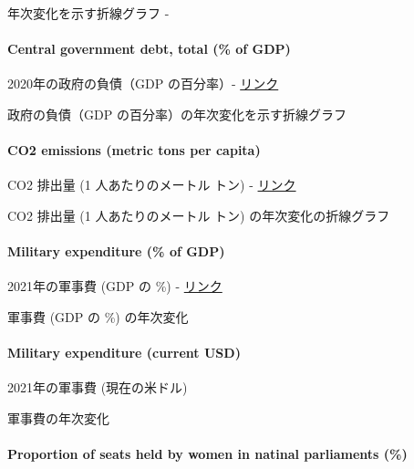 \documentclass[
]{bxjsbook}
\theoremstyle{definition}
\theoremstyle{definition}
\theoremstyle{definition}
\theoremstyle{definition}
\theoremstyle{remark}
\begin{document}
年次変化を示す折線グラフ -

\hypertarget{central-government-debt-total-of-gdp}{%
\paragraph{Central government debt, total (\% of GDP)}\label{central-government-debt-total-of-gdp}}

2020年の政府の負債（GDP の百分率）- \href{https://data.worldbank.org/indicator/GC.DOD.TOTL.GD.ZS?locations=JP-GB-RU-FR-CN-US-UA-DE\&start=2020\&end=2020\&view=bar}{リンク}

政府の負債（GDP の百分率）の年次変化を示す折線グラフ

\hypertarget{co2-emissions-metric-tons-per-capita}{%
\paragraph{CO2 emissions (metric tons per capita)}\label{co2-emissions-metric-tons-per-capita}}

CO2 排出量 (1 人あたりのメートル トン) - \href{https://data.worldbank.org/indicator/EN.ATM.CO2E.PC?locations=JP-GB-RU-FR-CN-US-UA-DE\&start=2019\&end=2019\&view=bar}{リンク}

CO2 排出量 (1 人あたりのメートル トン) の年次変化の折線グラフ

\hypertarget{military-expenditure-of-gdp}{%
\paragraph{Military expenditure (\% of GDP)}\label{military-expenditure-of-gdp}}

2021年の軍事費 (GDP の \%) - \href{https://data.worldbank.org/indicator/MS.MIL.XPND.GD.ZS?locations=JP-GB-RU-FR-CN-UA\&start=2021\&end=2021\&view=bar}{リンク}

軍事費 (GDP の \%) の年次変化

\hypertarget{military-expenditure-current-usd}{%
\paragraph{Military expenditure (current USD)}\label{military-expenditure-current-usd}}

2021年の軍事費 (現在の米ドル)

軍事費の年次変化

\hypertarget{proportion-of-seats-held-by-women-in-natinal-parliaments}{%
\paragraph{Proportion of seats held by women in natinal parliaments (\%)}\label{proportion-of-seats-held-by-women-in-natinal-parliaments}}
\end{document}
